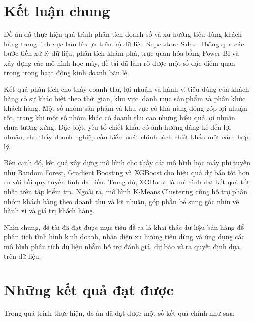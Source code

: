 \section{Kết luận chung}

Đồ án đã thực hiện quá trình phân tích doanh số và xu hướng tiêu dùng khách hàng trong lĩnh vực bán lẻ dựa trên bộ dữ liệu Superstore Sales. Thông qua các bước tiền xử lý dữ liệu, phân tích khám phá, trực quan hóa bằng Power BI và xây dựng các mô hình học máy, đề tài đã làm rõ được một số đặc điểm quan trọng trong hoạt động kinh doanh bán lẻ.

Kết quả phân tích cho thấy doanh thu, lợi nhuận và hành vi tiêu dùng của khách hàng có sự khác biệt theo thời gian, khu vực, danh mục sản phẩm và phân khúc khách hàng. Một số nhóm sản phẩm và khu vực có khả năng đóng góp lợi nhuận tốt, trong khi một số nhóm khác có doanh thu cao nhưng hiệu quả lợi nhuận chưa tương xứng. Đặc biệt, yếu tố chiết khấu có ảnh hưởng đáng kể đến lợi nhuận, cho thấy doanh nghiệp cần kiểm soát chính sách chiết khấu một cách hợp lý.

Bên cạnh đó, kết quả xây dựng mô hình cho thấy các mô hình học máy phi tuyến như Random Forest, Gradient Boosting và XGBoost cho hiệu quả dự báo tốt hơn so với hồi quy tuyến tính đa biến. Trong đó, XGBoost là mô hình đạt kết quả tốt nhất trên tập kiểm tra. Ngoài ra, mô hình K-Means Clustering cũng hỗ trợ phân nhóm khách hàng theo doanh thu và lợi nhuận, góp phần bổ sung góc nhìn về hành vi và giá trị khách hàng.

Nhìn chung, đề tài đã đạt được mục tiêu đề ra là khai thác dữ liệu bán hàng để phân tích tình hình kinh doanh, nhận diện xu hướng tiêu dùng và ứng dụng các mô hình phân tích dữ liệu nhằm hỗ trợ đánh giá, dự báo và ra quyết định dựa trên dữ liệu.

\section{Những kết quả đạt được}

Trong quá trình thực hiện, đồ án đã đạt được một số kết quả chính như sau:

